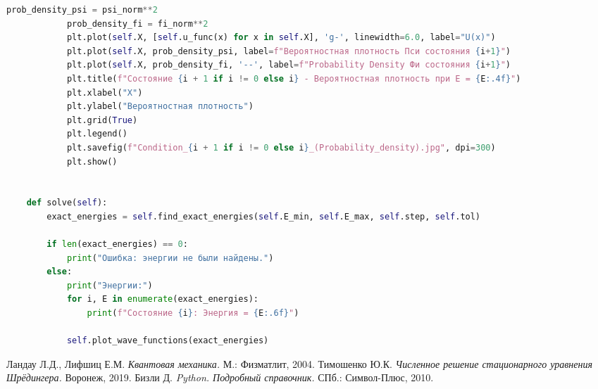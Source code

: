 \begin{lstlisting}[language=Python, caption=Код файла solver.py,label={lst:solver}]
            prob_density_psi = psi_norm**2
            prob_density_fi = fi_norm**2
            plt.plot(self.X, [self.u_func(x) for x in self.X], 'g-', linewidth=6.0, label="U(x)")
            plt.plot(self.X, prob_density_psi, label=f"Вероятностная плотность Пси состояния {i+1}")
            plt.plot(self.X, prob_density_fi, '--', label=f"Probability Density Фи состояния {i+1}")
            plt.title(f"Состояние {i + 1 if i != 0 else i} - Вероятностная плотность при E = {E:.4f}")
            plt.xlabel("X")
            plt.ylabel("Вероятностная плотность")
            plt.grid(True)
            plt.legend()
            plt.savefig(f"Condition_{i + 1 if i != 0 else i}_(Probability_density).jpg", dpi=300)
            plt.show()


    def solve(self):
        exact_energies = self.find_exact_energies(self.E_min, self.E_max, self.step, self.tol)

        if len(exact_energies) == 0:
            print("Ошибка: энергии не были найдены.")
        else:
            print("Энергии:")
            for i, E in enumerate(exact_energies):
                print(f"Состояние {i}: Энергия = {E:.6f}")

            self.plot_wave_functions(exact_energies)
\end{lstlisting}

\newpage
\begin{thebibliography}{9}
 Ландау Л.Д., Лифшиц Е.М. \textit{Квантовая механика.} М.: Физматлит, 2004.
 Тимошенко Ю.К. \textit{Численное решение стационарного уравнения Шрёдингера.} Воронеж, 2019.
 Бизли Д. \textit{Python. Подробный справочник.} СПб.: Символ-Плюс, 2010.
\end{thebibliography}